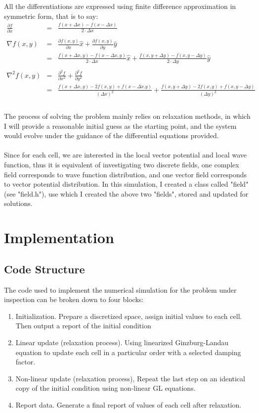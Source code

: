 \documentclass[11pt]{article}
\newcommand{\bqs}{\begin{eqnarray*}}
\newcommand{\eqs}{\end{eqnarray*}}
\newcommand{\bn}{\begin{enumerate}}
\newcommand{\en}{\end{enumerate}}
\newcommand{\pd}{\partial}
\begin{document}
All the differentiations are expressed using finite difference approximation in symmetric form, that is to say:\\
\bqs
\frac{\pd f}{\pd x}&=&\frac{f(x+\Delta x)-f(x-\Delta x)}{2\cdot \Delta x}\\
\\
\nabla f(x,y) &=& \frac{\pd f(x,y)}{\pd x}\hat{x}+\frac{\pd f(x,y)}{\pd y}\hat{y}\\
&=&\frac{f(x+\Delta x,y)-f(x-\Delta x,y)}{2\cdot \Delta x}\hat{x}+\frac{f(x,y+\Delta y)-f(x,y-\Delta y)}{2\cdot \Delta y}\hat{y}\\
\\
\nabla^2f(x,y)&=&\frac{\pd^2 f}{\pd x^2}+\frac{\pd^2 f}{\pd y^2}\\
&=&\frac{f(x+\Delta x,y)-2f(x,y)+f(x-\Delta x.y)}{(\Delta x)^2}+\frac{f(x,y+\Delta y)-2f(x,y)+f(x,y-\Delta y)}{(\Delta y)^2}\\
\eqs
\\
The process of solving the problem mainly relies on relaxation methods, in which I will provide a reasonable initial guess as the starting point, and the system would evolve under the guidance of the differential equations provided.\\
\\
Since for each cell, we are interested in the local vector potential and local wave function, thus it is equivalent of investigating two discrete fields, one complex field corresponds to wave function distribution, and one vector field corresponds to vector potential distribution. In this simulation, I created a class called "field" (see "field.h"), use which I created the above two "fields", stored and updated for solutions.\\


\section{Implementation}

\subsection{Code Structure}
The code used to implement the numerical simulation for the problem under inspection can be broken down to four blocks:\\
\bn
\item Initialization. Prepare a discretized space, assign initial values to each cell. Then output a report of the initial condition
\item Linear update (relaxation process). Using linearized Ginzburg-Landau equation to update each cell in a particular order with a selected damping factor.
\item Non-linear update (relaxation process), Repeat the last step on an identical copy of the initial condition using non-linear GL equations.
\item Report data. Generate a final report of values of each cell after relaxation.
\en
\end{document}
